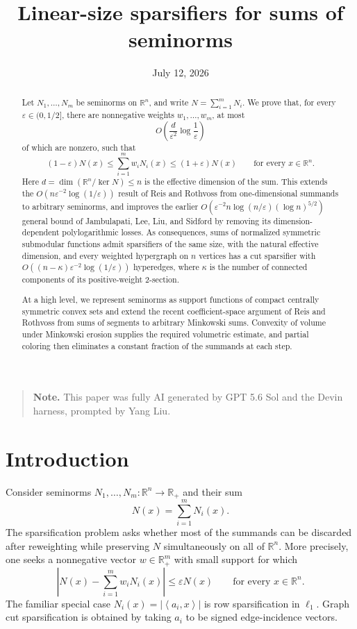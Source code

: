 \documentclass[11pt]{article}
\title{Linear-size sparsifiers for sums of seminorms}
\author{}
\date{July 12, 2026}
\theoremstyle{remark}
\newcommand{\R}{\mathbb{R}}
\newcommand{\eps}{\varepsilon}
\newcommand{\ip}[2]{\left\langle #1,#2\right\rangle}
\begin{document}
\maketitle

\begin{abstract}
Let $N_1,\ldots,N_m$ be seminorms on $\R^n$, and write
$N=\sum_{i=1}^m N_i$.  We prove that, for every
$\eps\in(0,1/2]$, there are nonnegative weights $w_1,\ldots,w_m$, at
most
\[
  O\!\left(\frac{d}{\eps^2}\log\frac1\eps\right)
\]
of which are nonzero, such that
\[
  (1-\eps)N(x)\leq \sum_{i=1}^m w_iN_i(x)
  \leq (1+\eps)N(x)\qquad\text{for every }x\in\R^n.
\]
Here $d=\dim(\R^n/\ker N)\leq n$ is the effective dimension of the
sum.  This extends the $O(n\eps^{-2}\log(1/\eps))$ result of Reis and
Rothvoss from one-dimensional summands to arbitrary seminorms, and improves
the earlier $O(\eps^{-2}n\log(n/\eps)(\log n)^{5/2})$ general bound of
Jambulapati, Lee, Liu, and Sidford by removing its dimension-dependent
polylogarithmic losses.  As consequences,
sums of normalized symmetric submodular functions admit sparsifiers
of the same size, with the natural effective dimension, and every
weighted hypergraph on $n$ vertices has a cut sparsifier with
$O((n-\kappa)\eps^{-2}\log(1/\eps))$ hyperedges, where $\kappa$ is the
number of connected components of its positive-weight $2$-section.

At a high level, we represent seminorms as support functions of
compact centrally symmetric convex sets and extend the recent
coefficient-space argument of Reis and Rothvoss from sums of segments
to arbitrary Minkowski sums.  Convexity of volume under Minkowski
erosion supplies the required volumetric estimate, and partial
coloring then eliminates a constant fraction of the summands at each
step.
\end{abstract}

\begin{quote}
\small\noindent\textbf{Note.} This paper was fully AI generated by GPT
5.6 Sol and the Devin harness, prompted by Yang Liu.
\end{quote}

\section{Introduction}

Consider seminorms $N_1,\ldots,N_m:\R^n\to\R_+$ and their sum
\begin{equation}\label{eq:sum-norm}
  N(x)=\sum_{i=1}^m N_i(x).
\end{equation}
The sparsification problem asks whether most of the summands can be
discarded after reweighting while preserving $N$ simultaneously on all
of $\R^n$.  More precisely, one seeks a nonnegative vector
$w\in\R_+^m$ with small support for which
\begin{equation}\label{eq:approximation}
  \left|N(x)-\sum_{i=1}^m w_iN_i(x)\right|
  \leq \eps N(x)\qquad\text{for every }x\in\R^n.
\end{equation}
The familiar special case $N_i(x)=|\ip{a_i}{x}|$ is row
sparsification in $\ell_1$.  Graph cut sparsification is obtained by
taking $a_i$ to be signed edge-incidence vectors.
\end{document}
